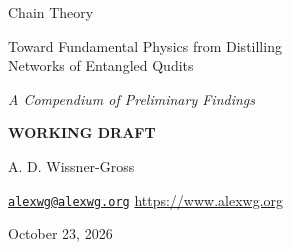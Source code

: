 \thispagestyle{empty}
\null\vfill
\begin{center}
{\fontsize{44}{52}\selectfont Chain Theory\par}
\vspace{1.4em}
{\Large Toward Fundamental Physics from Distilling\\[0.3em] Networks of Entangled Qudits\par}
\vspace{2.6em}
{\Large\itshape A Compendium of Preliminary Findings\par}
\vspace{1.6em}
{\large\bfseries WORKING DRAFT\par}
\vspace{3.4em}
{\large A. D. Wissner-Gross\par}
\vspace{0.8em}
\href{mailto:alexwg@alexwg.org}{\texttt{alexwg@alexwg.org}} \quad \url{https://www.alexwg.org}\par
\vspace{1.6em}
{\large October 23, 2026\par}
\end{center}
\vfill\null
\clearpage

\clearpage
\tableofcontents
\clearpage

